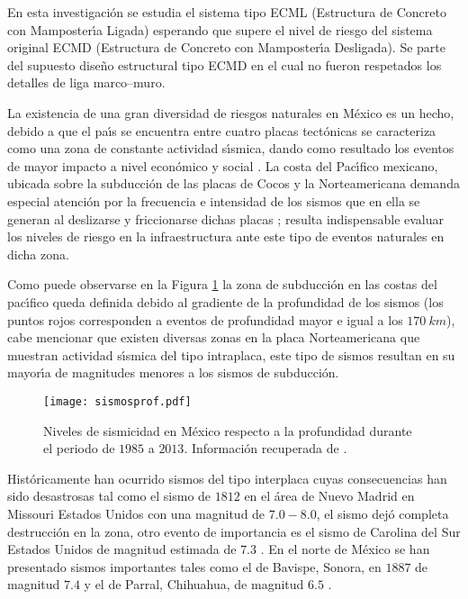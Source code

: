 En esta investigaci\'on se estudia el sistema tipo ECML (Estructura de Concreto con Mamposter\'{\i}a Ligada) esperando que supere el nivel de riesgo del sistema original  ECMD (Estructura de Concreto con Mamposter\'{\i}a Desligada).  Se parte del supuesto dise\~no estructural tipo ECMD en el cual no fueron respetados los detalles de liga marco--muro.

La existencia de una gran diversidad de riesgos naturales en M\'exico es un hecho, debido a que el pa\'{\i}s se encuentra entre cuatro placas tect\'onicas se caracteriza como una zona de constante actividad s\'{\i}smica, dando como resultado los eventos de mayor impacto a nivel econ\'omico y social \cite{CEPAL2007}. La costa del Pac\'{\i}fico mexicano, ubicada sobre la subducci\'on de las placas de Cocos y la Norteamericana demanda especial atenci\'on por la frecuencia e intensidad de los sismos que en ella se generan al deslizarse y friccionarse dichas placas \cite{CENAPRED2001}; resulta indispensable evaluar los niveles de riesgo en la infraestructura ante este tipo de eventos naturales en dicha zona.

\newpage

Como puede observarse en la Figura \ref{figsis:fig1} la zona de subducci\'on en las costas del pac\'{\i}fico queda definida debido al gradiente de la profundidad de los sismos (los puntos rojos corresponden a eventos de profundidad mayor e igual a los $170 \ km$), cabe mencionar que existen diversas zonas en la placa Norteamericana que muestran actividad s\'{\i}smica del tipo intraplaca, este tipo de sismos resultan en su mayor\'{\i}a de magnitudes menores a los sismos de subducci\'on. 

\begin{figure}[htbp]
	\centering
		\texttt{[image: sismosprof.pdf]}
	\caption{Niveles de sismicidad en M\'exico respecto a la profundidad durante el periodo de $1985$ a $2013$. Informaci\'on recuperada de \cite{USGS2013}.}
	\label{figsis:fig1}
\end{figure}

Hist\'oricamente han ocurrido sismos del tipo interplaca cuyas consecuencias han sido desastrosas tal como el sismo de $1812$ en el \'area de Nuevo Madrid en Missouri Estados Unidos con una magnitud de $7.0-8.0$, el sismo dej\'o completa destrucci\'on en la zona, otro evento de importancia es el sismo de Carolina del Sur Estados Unidos de magnitud estimada de $7.3$ \cite{W2007}. En el norte de M\'exico se han presentado sismos importantes tales como el de Bavispe, Sonora, en $1887$ de  magnitud $7.4$ y el de Parral, Chihuahua, de magnitud $6.5$ \cite{MA2009}.

